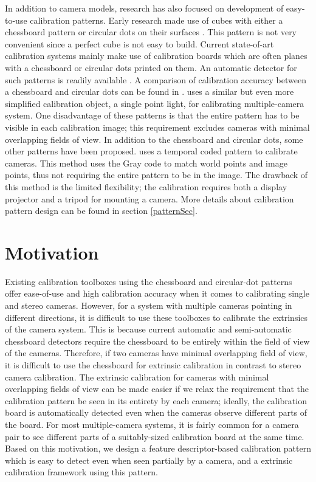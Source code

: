 \documentclass{report}
\begin{document}
In addition to camera models, research has also focused on development of easy-to-use calibration patterns. Early research made use of cubes with either a chessboard pattern or circular dots on their surfaces \cite{bouguet2004camera}. This pattern is not very convenient since a perfect cube is not easy to build. Current state-of-art calibration systems mainly make use of calibration boards which are often planes with a chessboard or circular dots printed on them. An automatic detector for such patterns is readily available \cite{rufli2008automatic}. A comparison of calibration accuracy between a chessboard and circular dots can be found in \cite{mallon2007pattern}. \cite{easycal} uses a similar but even more simplified calibration object, a single point light, for calibrating multiple-camera system. One disadvantage of these patterns is that the entire pattern has to be visible in each calibration image; this requirement excludes cameras with minimal overlapping fields of view. In addition to the chessboard and circular dots, some other patterns have been proposed. \cite{schmalz2011camera} uses a temporal coded pattern to calibrate cameras. This method uses the Gray code to match world points and image points, thus not requiring the entire pattern to be in the image. The drawback of this method is the limited flexibility; the calibration requires both a display projector and a tripod for mounting a camera. More details about calibration pattern design can be found in section \ref{patternSec}. 

\section{Motivation}
\label{motiveSec}
Existing calibration toolboxes using the chessboard and circular-dot patterns offer ease-of-use and high calibration accuracy when it comes to calibrating single and stereo cameras. However, for a system with multiple cameras pointing in different directions, it is difficult to use these toolboxes to calibrate the extrinsics of the camera system. This is because current automatic and semi-automatic chessboard detectors require the chessboard to be entirely within the field of view of the cameras. Therefore, if two cameras have minimal overlapping field of view, it is difficult to use the chessboard for extrinsic calibration in contrast to stereo camera calibration. The extrinsic calibration for cameras with minimal overlapping fields of view can be made easier if we relax the requirement that the calibration pattern be seen in its entirety by each camera; ideally, the calibration board is automatically detected even when the cameras observe different parts of the board. For most multiple-camera systems, it is fairly common for a camera pair to see different parts of a suitably-sized calibration board at the same time. Based on this motivation, we design a feature descriptor-based calibration pattern which is easy to detect even when seen partially by a camera, and a extrinsic calibration framework using this pattern. 
\end{document}
